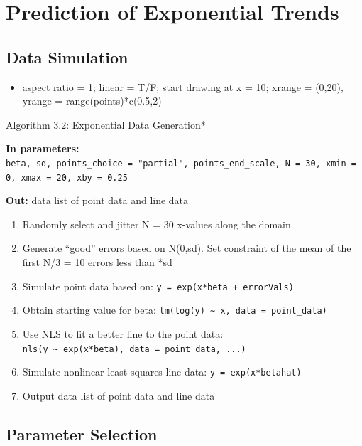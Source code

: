 \documentclass[print]{nuthesis}
\providecommand{\tightlist}{%
  \setlength{\itemsep}{0pt}\setlength{\parskip}{0pt}}
\begin{document}
\hypertarget{prediction-of-exponential-trends}{%
\section{Prediction of Exponential Trends}\label{prediction-of-exponential-trends}}

\hypertarget{data-simulation-1}{%
\subsection{Data Simulation}\label{data-simulation-1}}

\begin{itemize}
\tightlist
\item
  aspect ratio = 1; linear = T/F; start drawing at x = 10; xrange = (0,20), yrange = range(points)*c(0.5,2)
\end{itemize}

\noindent *Algorithm 3.2: Exponential Data Generation*

\textbf{In parameters:} \texttt{beta,\ sd,\ points\_choice\ =\ "partial",\ points\_end\_scale,\ N\ =\ 30,\ xmin\ =\ 0,\ xmax\ =\ 20,\ xby\ =\ 0.25}

\textbf{Out:} data list of point data and line data

\begin{enumerate}
\def\labelenumi{\arabic{enumi}.}
\tightlist
\item
  Randomly select and jitter N = 30 x-values along the domain.
\item
  Generate ``good'' errors based on N(0,sd). Set constraint of the mean of the first N/3 = 10 errors less than *sd\textbar{}
\item
  Simulate point data based on: \texttt{y\ =\ exp(x*beta\ +\ errorVals)}
\item
  Obtain starting value for beta: \texttt{lm(log(y)\ \textasciitilde{}\ x,\ data\ =\ point\_data)}
\item
  Use NLS to fit a better line to the point data: \texttt{nls(y\ \textasciitilde{}\ exp(x*beta),\ data\ =\ point\_data,\ ...)}
\item
  Simulate nonlinear least squares line data: \texttt{y\ =\ exp(x*betahat)}
\item
  Output data list of point data and line data
\end{enumerate}

\hypertarget{parameter-selection-2}{%
\subsection{Parameter Selection}\label{parameter-selection-2}}
\end{document}
